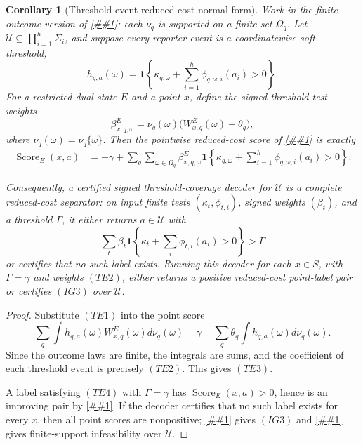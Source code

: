 \documentclass[10pt]{article}
\newcommand{\cref}[1]{\ref{##1}}
\newtheorem{corollary}[theorem]{Corollary}
\theoremstyle{definition}
\begin{document}
\begin{corollary}[Threshold-event reduced-cost normal form]
   \label{cor:threshold-event-reduced-cost}
   Work in the finite-outcome version of
   \cref{lem:implicit-reduced-gain-separation}: each \(\nu_q\) is supported on
   a finite set \(\Omega_q\).  Let
   \(\mathcal U\subseteq\prod_{i=1}^h\Sigma_i\), and suppose every reporter
   event is a coordinatewise soft threshold,
   \[
      h_{q,a}(\omega)
      =
      \mathbf 1\left\{
      \kappa_{q,\omega}+\sum_{i=1}^h\phi_{q,\omega,i}(a_i)>0
      \right\}.
      \tag{TE1}
   \]
   For a restricted dual state \(E\) and a point \(x\), define the signed
   threshold-test weights
   \[
      \beta^E_{x,q,\omega}
      =
      \nu_q(\omega)\bigl(W^E_{x,q}(\omega)-\theta_q\bigr),
      \tag{TE2}
   \]
   where \(\nu_q(\omega)=\nu_q\{\omega\}\).  Then the pointwise reduced-cost
   score of \cref{cor:pointwise-reduced-cost-separation} is exactly
   \[
   \begin{aligned}
      \operatorname{Score}_E(x,a)
      &=
      -\gamma+
      \sum_q\sum_{\omega\in\Omega_q}
      \beta^E_{x,q,\omega}
      \mathbf 1\left\{
      \kappa_{q,\omega}
      +\sum_{i=1}^h\phi_{q,\omega,i}(a_i)>0
      \right\}.
   \end{aligned}
      \tag{TE3}
   \]

   Consequently, a certified signed threshold-coverage decoder for
   \(\mathcal U\) is a complete reduced-cost separator: on input finite tests
   \((\kappa_t,\phi_{t,i})\), signed weights \((\beta_t)\), and a threshold
   \(\Gamma\), it either returns \(a\in\mathcal U\) with
   \[
      \sum_t\beta_t
      \mathbf 1\left\{
      \kappa_t+\sum_i\phi_{t,i}(a_i)>0
      \right\}>\Gamma
      \tag{TE4}
   \]
   or certifies that no such label exists.  Running this decoder for each
   \(x\in S\), with \(\Gamma=\gamma\) and weights \((TE2)\), either returns a
   positive reduced-cost point-label pair or certifies \((IG3)\) over
   \(\mathcal U\).
\end{corollary}

\begin{proof}
   Substitute \((TE1)\) into the point score
   \[
      \sum_q\int h_{q,a}(\omega)W^E_{x,q}(\omega)d\nu_q(\omega)
      -
      \gamma-\sum_q\theta_q\int h_{q,a}(\omega)d\nu_q(\omega).
   \]
   Since the outcome laws are finite, the integrals are sums, and the
   coefficient of each threshold event is precisely \((TE2)\).  This gives
   \((TE3)\).

   A label satisfying \((TE4)\) with \(\Gamma=\gamma\) has
   \(\operatorname{Score}_E(x,a)>0\), hence is an improving pair by
   \cref{cor:pointwise-reduced-cost-separation}.  If the decoder certifies that
   no such label exists for every \(x\), then all point scores are nonpositive;
   \cref{cor:pointwise-reduced-cost-separation} gives \((IG3)\) and
   \cref{lem:implicit-reduced-gain-separation} gives finite-support
   infeasibility over \(\mathcal U\).
\end{proof}
\end{document}
